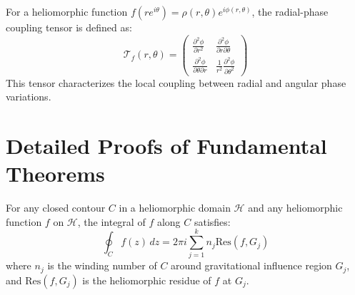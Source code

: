 \begin{definition}
\label{def:radial_phase_coupling_tensor}
For a heliomorphic function $f(re^{i\theta}) = \rho(r,\theta)e^{i\phi(r,\theta)}$, the radial-phase coupling tensor is defined as:
\begin{equation}
\mathcal{T}_f(r,\theta) = \begin{pmatrix}
\frac{\partial^2 \phi}{\partial r^2} & \frac{\partial^2 \phi}{\partial r \partial \theta} \\
\frac{\partial^2 \phi}{\partial \theta \partial r} & \frac{1}{r^2}\frac{\partial^2 \phi}{\partial \theta^2}
\end{pmatrix}
\end{equation}
This tensor characterizes the local coupling between radial and angular phase variations.
\end{definition}

\section{Detailed Proofs of Fundamental Theorems}

\begin{theorem}
\label{thm:heliomorphic_integration}
For any closed contour $C$ in a heliomorphic domain $\mathcal{H}$ and any heliomorphic function $f$ on $\mathcal{H}$, the integral of $f$ along $C$ satisfies:
\begin{equation}
\oint_C f(z) \, dz = 2\pi i \sum_{j=1}^k n_j \text{Res}(f, G_j)
\end{equation}
where $n_j$ is the winding number of $C$ around gravitational influence region $G_j$, and $\text{Res}(f, G_j)$ is the heliomorphic residue of $f$ at $G_j$.
\end{theorem}

